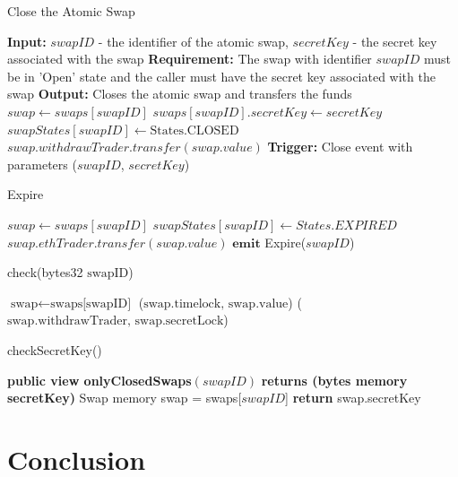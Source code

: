 \documentclass[twocolumn]{article}
\begin{document}
\begin{algorithm}[htbp]
\caption{Close the Atomic Swap}
\begin{algorithmic}[1]
\State \textbf{Input:} $swapID$ - the identifier of the atomic swap, $secretKey$ - the secret key associated with the swap
\State \textbf{Requirement:} The swap with identifier $swapID$ must be in 'Open' state and the caller must have the secret key associated with the swap
\State \textbf{Output:} Closes the atomic swap and transfers the funds
\State $swap \gets swaps[swapID]$
\State $swaps[swapID].secretKey \gets secretKey$
\State $swapStates[swapID] \gets \text{States.CLOSED}$
\State $swap.withdrawTrader.transfer(swap.value)$
\State \textbf{Trigger:} Close event with parameters ($swapID$, $secretKey$)
\EndFunction
\end{algorithmic}
\end{algorithm}

\begin{algorithm}[htbp]
\caption{Expire}
\begin{algorithmic}[1]
\State $swap \gets swaps[{swapID}]$
\State $swapStates[{swapID}] \gets States.EXPIRED$
\State $swap.ethTrader.transfer(swap.value)$
\State $\textbf{emit}$ Expire(${swapID}$)
\EndFunction
\end{algorithmic}
\end{algorithm}

\begin{algorithm}[htbp]
\caption{check(bytes32 $\text{swapID}$)}
\begin{algorithmic}[1]
\State $\text{swap} \gets \text{swaps[}\text{swapID}\text{]}$
\State \Return ($\text{swap.timelock, swap.value}$)
\State \Return ($\text{swap.withdrawTrader, swap.secretLock}$)
\EndFunction
\end{algorithmic}
\end{algorithm}

\begin{algorithm}[htbp]
\caption{checkSecretKey()}
\begin{algorithmic}[1]
\State \textbf{public view onlyClosedSwaps}$({swapID})$
\State \textbf{returns (bytes memory secretKey)}
\State Swap memory swap = swaps[${swapID}$]
\State \textbf{return} swap.secretKey
\EndFunction
\end{algorithmic}
\end{algorithm}

\section{Conclusion}
\end{document}
